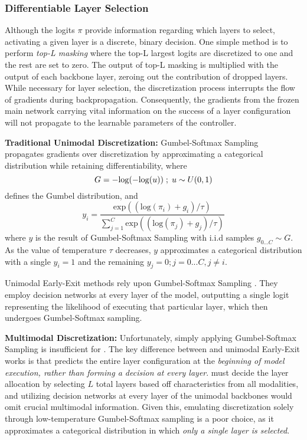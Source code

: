 \subsubsection{Differentiable Layer Selection}
Although the logits $\pi$ provide information regarding which layers to select, activating a given layer is a discrete, binary decision. One simple method is to perform \emph{top-L masking} where the top-L largest logits are discretized to one and the rest are set to zero. The output of top-L masking is multiplied with the output of each backbone layer, zeroing out the contribution of dropped layers.
While necessary for layer selection, the discretization process interrupts the flow of gradients during backpropagation. 
Consequently, the gradients from the frozen main network carrying vital information on the success of a layer configuration will not propagate to the learnable parameters of the controller. 


\textbf{Traditional Unimodal Discretization:}
Gumbel-Softmax Sampling~\cite{maddison2016gumbel} propagates gradients over discretization by approximating a categorical distribution while retaining differentiability, where 
\begin{equation}
    G = -\mathrm{log}(-\mathrm{log}(u))\;  ;\;  u \sim U(0, 1) \\
\end{equation}
defines the Gumbel distribution, and
\begin{equation}
            y_i = \frac{\mathrm{exp}((\mathrm{log}(\pi_i) + g_i) / \tau)}{\sum_{j=1}^C \mathrm{exp}((\mathrm{log}(\pi_j) + g_j) / \tau)} 
\end{equation}
where $y$ is the result of Gumbel-Softmax Sampling with i.i.d samples $g_{0...C} \sim G$. As the value of temperature $\tau$ decreases, $y$ approximates a categorical distribution with a single $y_i = 1$ and the remaining $y_j = 0 ; j=0...C, j \neq i$.


Unimodal Early-Exit methods rely upon Gumbel-Softmax Sampling \cite{meng2022adavit}. 
They employ decision networks at every layer of the model, outputting a single logit representing the likelihood of executing that particular layer, which then undergoes Gumbel-Softmax sampling. 




\textbf{Multimodal Discretization:}
Unfortunately, simply applying Gumbel-Softmax Sampling is insufficient for \name. 
The key difference between \name and unimodal Early-Exit works is that \name predicts the entire layer configuration at the \emph{beginning of model execution, rather than forming a decision at every layer}. \name must decide the layer allocation by selecting $L$ total layers based off characteristics from all modalities, and utilizing decision networks at every layer of the unimodal backbones would omit crucial multimodal information. 
Given this, emulating discretization solely through low-temperature Gumbel-Softmax sampling is a poor choice, as it approximates a categorical distribution in which \emph{only a single layer is selected}. 

